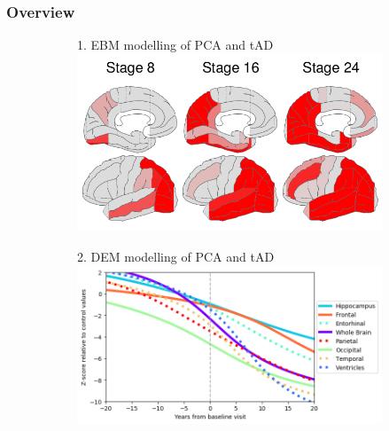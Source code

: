 \documentclass[10pt,xcolor=table]{beamer}
\begin{document}
\begin{frame}
\frametitle{Overview}


\vspace{-1em}
\begin{figure}
\centering
\begin{subfigure}{0.47\textwidth}
\centering

1. EBM modelling of PCA and tAD\\
\includegraphics[scale=0.15]{ebm_thumb.png}

\end{subfigure}
\begin{subfigure}{0.47\textwidth}
\centering
{
2. DEM  modelling of PCA and tAD\\
\includegraphics[scale=0.15]{../images/dem/mriSmallSebPaper_DEMStdPCA_trajAlign.png}
}
\end{subfigure}


\end{figure}
\end{frame}
\end{document}
